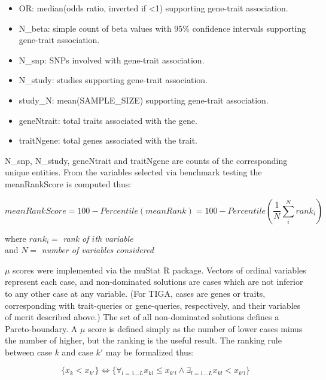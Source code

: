 \begin{itemize}
\item OR: median(odds ratio, inverted if <1) supporting gene-trait association.
\item N\_beta: simple count of beta values with 95\% confidence intervals supporting gene-trait association.
\item N\_snp: SNPs involved with gene-trait association.
\item N\_study: studies supporting gene-trait association.
\item study\_N: mean(SAMPLE\_SIZE) supporting gene-trait association.
\item geneNtrait: total traits associated with the gene.
\item traitNgene: total genes associated with the trait.
\end{itemize}

N\_snp, N\_study, geneNtrait and traitNgene are counts of the corresponding unique entities. From the variables selected via benchmark testing the meanRankScore is computed thus:

\begin{equation}
    meanRankScore = 100 - Percentile(meanRank) = 100 - Percentile(\frac{1}{N} \sum_{i}^{N} rank_{i})
\end{equation}

\begin{center}
    where $ rank_{i} = $ \emph{rank of $ i $th variable} \\
    and $ N = $ \emph{number of variables considered}
\end{center}

$\mu$ scores were implemented via the muStat\cite{Wittkowski2012-fk} R package. Vectors of ordinal variables represent each case, and non-dominated solutions are cases which are not inferior to any other case at any variable. (For TIGA, cases are genes or traits, corresponding with trait-queries or gene-queries, respectively, and their variables of merit described above.) The set of all non-dominated solutions defines a Pareto-boundary. A $\mu$ score is defined simply as the number of lower cases minus the number of higher, but the ranking is the useful result. The ranking rule between case $k$ and case $k'$ may be formalized thus:

\begin{equation}
    \{ x_k < x_{k'} \} \Leftrightarrow \{ \forall_{l=1...L} x_{kl} \leq x_{k'l} \wedge \exists_{l=1...L} x_{kl} < x_{k'l} \}
\end{equation}


